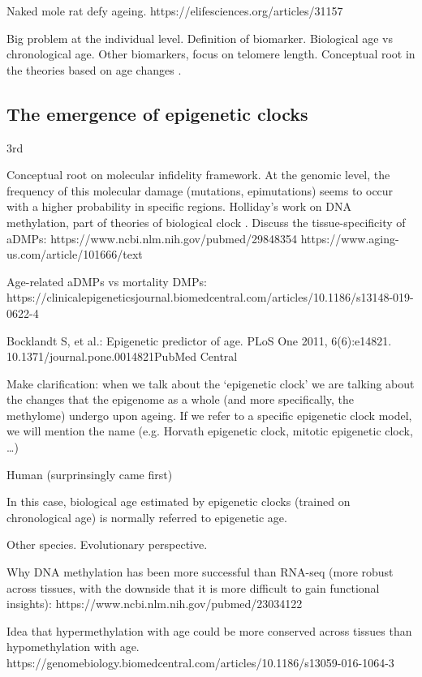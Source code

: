 Naked mole rat defy ageing. https://elifesciences.org/articles/31157


Big problem at the individual level. Definition of biomarker. Biological age vs chronological age. Other biomarkers, focus on telomere length. 
Conceptual root in the theories based on age changes \cite{Medvedev1990}.

\subsection{The emergence of epigenetic clocks}

3rd

Conceptual root on molecular infidelity framework. At the genomic level, the frequency of this molecular damage (mutations, epimutations) seems to occur with a higher probability in specific regions. 
Holliday's work on DNA methylation, part of theories of biological clock \cite{Medvedev1990}. 
Discuss the tissue-specificity of aDMPs:
https://www.ncbi.nlm.nih.gov/pubmed/29848354
https://www.aging-us.com/article/101666/text

Age-related aDMPs vs mortality DMPs:
https://clinicalepigeneticsjournal.biomedcentral.com/articles/10.1186/s13148-019-0622-4

Bocklandt S, et al.: Epigenetic predictor of age. PLoS One 2011, 6(6):e14821. 10.1371/journal.pone.0014821PubMed Central

Make clarification: when we talk about the ‘epigenetic clock’ we are talking about the changes that the epigenome as a whole (and more specifically, the methylome) undergo upon ageing. If we refer to a specific epigenetic clock model, we will mention the name (e.g. Horvath epigenetic clock, mitotic epigenetic clock, …)

Human (surprinsingly came first)

In this case, biological age estimated by epigenetic clocks (trained on chronological age) is normally referred to epigenetic age. 

Other species. Evolutionary perspective.

Why DNA methylation has been more successful than RNA-seq (more robust across tissues, with the downside that it is more difficult to gain functional insights): https://www.ncbi.nlm.nih.gov/pubmed/23034122

Idea that hypermethylation with age could be more conserved across tissues than hypomethylation with age.
https://genomebiology.biomedcentral.com/articles/10.1186/s13059-016-1064-3

